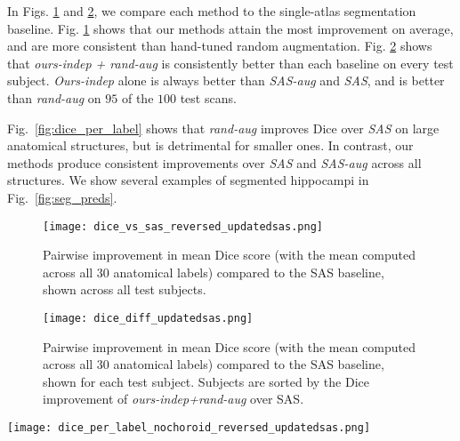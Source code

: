 \documentclass[10pt,twocolumn,letterpaper]{article}
\begin{document}
In Figs. \ref{fig:dice_vs_sas} and \ref{fig:dice_diff}, we compare each method to the single-atlas segmentation baseline. Fig. \ref{fig:dice_vs_sas} shows that our methods attain the most improvement on average, and are more consistent than hand-tuned random augmentation. Fig. \ref{fig:dice_diff} shows that \textit{ours-indep + rand-aug} is consistently better than each baseline on every test subject. \textit{Ours-indep} alone is always better than \textit{SAS-aug} and \textit{SAS}, and is better than \textit{rand-aug} on $95$ of the $100$ test scans. 

Fig.~\ref{fig:dice_per_label} shows that \textit{rand-aug} improves Dice over \textit{SAS} on large anatomical structures, but is detrimental for smaller ones. In contrast, our methods produce consistent improvements over \textit{SAS} and \textit{SAS-aug} across all structures. We show several examples of segmented hippocampi in Fig.~\ref{fig:seg_preds}.


\begin{figure}[t]
\texttt{[image: dice\_vs\_sas\_reversed\_updatedsas.png]}
        \vspace{-8pt}
    \caption{Pairwise improvement in mean Dice score (with the mean computed across all $30$ anatomical labels) compared to the SAS baseline, shown across all test subjects. }\label{fig:dice_vs_sas}
\end{figure}

\begin{figure}[t]
    \centering
    \texttt{[image: dice\_diff\_updatedsas.png]}
    \vspace{-14pt}
    \caption{Pairwise improvement in mean Dice score (with the mean computed across all $30$ anatomical labels) compared to the SAS baseline, shown for each test subject. Subjects are sorted by the Dice improvement of \textit{ours-indep+rand-aug} over SAS.}\label{fig:dice_diff}
\end{figure}
\begin{figure*}[t]
    \centering
    \texttt{[image: dice\_per\_label\_nochoroid\_reversed\_updatedsas.png]}
        \vspace{-12pt}
    \caption{Segmentation accuracy of each method across various brain structures. Labels are sorted by the volume occupied by each structure in the atlas (shown in parentheses), and labels consisting of left and right structures (\textit{e.g.}, Hippocampus) are combined. We abbreviate the labels: white matter (WM), cortex (CX), ventricle (vent), and cerebrospinal fluid (CSF). }\label{fig:dice_per_label}
\end{figure*}
\end{document}

